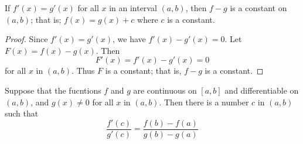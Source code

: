 \begin{corollary}
    If \(f'(x)=g'(x)\) for all \(x\) in an interval \((a,b)\), then \(f-g\) is
    a constant on \((a,b)\); that is; \(f(x)=g(x)+c\) where \(c\) is a
    constant.
\end{corollary}
\begin{proof}
    Since \(f'(x)=g'(x)\), we have \(f'(x)-g'(x)=0\).
    Let \(F(x)=f(x)-g(x)\).
    Then
    \[F'(x)=f'(x)-g'(x)=0\]
    for all \(x\) in \((a,b)\).
    Thus \(F\) is a constant; that is, \(f-g\) is a constant.
\end{proof}
\begin{theorem}
    Suppose that the fucntions \(f\) and \(g\) are continuous on \([a,b]\) and
    differentiable on \((a,b)\), and \(g(x)\neq 0\) for all \(x\) in
    \((a,b)\).
    Then there is a number \(c\) in \((a,b)\) such that
    \[\frac{f'(c)}{g'(c)}=\frac{f(b)-f(a)}{g(b)-g(a)}\]
\end{theorem}